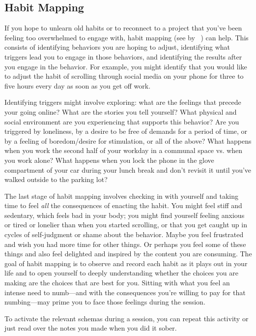 \documentclass[11pt,oneside]{book}
\let\cite\parencite
\newcommand{\writtenByDay}[1]{#1}
\newcommand{\prosecite}[1]{\citetitle{#1} by \citefullauthor{#1}~\cite{#1}}
\begin{document}
\subsection*{Habit Mapping}
\writtenByDay{
If you hope to unlearn old habits or to reconnect to a project that you've been feeling too overwhelmed to engage with, habit mapping (see \prosecite{habitMapping}) can help. This consists of identifying behaviors you are hoping to adjust, identifying what triggers lead you to engage in those behaviors, and identifying the results after you engage in the behavior. For example, you might identify that you would like to adjust the habit of scrolling through social media on your phone for three to five hours every day as soon as you get off work.

Identifying triggers might involve exploring: what are the feelings that precede your going online? What are the stories you tell yourself? What physical and social environment are you experiencing that supports this behavior? Are you triggered by loneliness, by a desire to be free of demands for a period of time, or by a feeling of boredom/desire for stimulation, or all of the above? What happens when you work the second half of your workday in a communal space vs. when you work alone? What happens when you lock the phone in the glove compartment of your car during your lunch break and don't revisit it until you've walked outside to the parking lot?

The last stage of habit mapping involves checking in with yourself and taking time to feel \textit{all} the consequences of enacting the habit. You might feel stiff and sedentary, which feels bad in your body; you might find yourself feeling anxious or tired or lonelier than when you started scrolling, or that you get caught up in cycles of self-judgment or shame about the behavior. Maybe you feel frustrated and wish you had more time for other things. Or perhaps you feel some of these things and also feel delighted and inspired by the content you are consuming. The goal of habit mapping is to observe and record each habit as it plays out in your life and to open yourself to deeply understanding whether the choices you are making are the choices that are best for you. Sitting with what you feel an intense need to numb---and with the consequences you're willing to pay for that numbing---may prime you to face those feelings during the session.
}

To activate the relevant schemas during a session, you can repeat this activity or just read over the notes you made when you did it sober.
\end{document}

